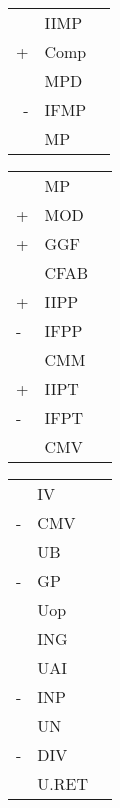 \begin{Large}

\begin{multicols}{3}

\begin{Table}
\begin{tabular}{rll}
 & IIMP &  \\
+ & Comp &  \\ \hline
 & MPD  &  \\
- & IFMP &  \\ \hline
 & MP   & 
\end{tabular}
\end{Table}

\columnbreak
	
\begin{Table}
\begin{tabular}{lll}
  & MP   &  \\
+ & MOD  &  \\
+ & GGF  &  \\ \hline
  & CFAB &  \\
+ & IIPP &  \\
- & IFPP &  \\ \hline
  & CMM  &  \\
+ & IIPT &  \\
- & IFPT &  \\ \hline
  & CMV   & 
\end{tabular}
\end{Table}

\columnbreak
\begin{Table}
\begin{tabular}{lll}
  & IV    &  \\
- & CMV   &  \\ \hline
  & UB    &  \\
- & GP    &  \\ \hline
  & Uop   &  \\
  & ING   &  \\ \hline
  & UAI   &  \\
- & INP   &  \\ \hline
  & UN    &  \\
- & DIV   &  \\ \hline
  & U.RET & 
\end{tabular}
\end{Table}

\end{multicols}

\end{Large}

